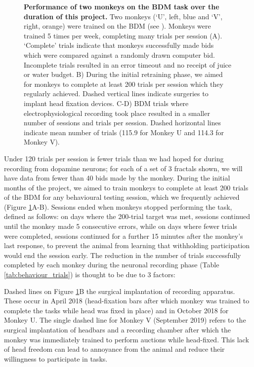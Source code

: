 \begin{figure}[htbp!] 
\centering    

\caption[Performance of two monkeys on the BDM task over the duration of this project.]{\textbf{Performance of two monkeys on the BDM task over the duration of this project.} Two monkeys (‘U’, left, blue and ‘V’, right, orange) were trained on the BDM (see \cite{almohammadRewardValueRevealed2022}). Monkeys were trained 5 times per week, completing many trials per session (A). ‘Complete’ trials indicate that monkeys successfully made bids which were compared against a randomly drawn computer bid. Incomplete trials resulted in an error timeout and no receipt of juice or water budget. B) During the initial retraining phase, we aimed for monkeys to complete at least 200 trials per session which they regularly achieved. Dashed vertical lines indicate surgeries to implant head fixation devices. C-D) BDM trials where electrophysiological recording took place resulted in a smaller number of sessions and trials per session. Dashed horizontal lines indicate mean number of trials (115.9 for Monkey U and 114.3 for Monkey V).}
\label{fig:monkey_trials}
\end{figure}

Under 120 trials per session is fewer trials than we had hoped for during recording from dopamine neurons; for each of a set of 3 fractals shown, we will have data from fewer than 40 bids made by the monkey. During the initial months of the project, we aimed to train monkeys to complete at least 200 trials of the BDM for any behavioural testing session, which we frequently achieved (Figure \ref{fig:monkey_trials}A-B). Sessions ended when monkeys stopped performing the task, defined as follows: on days where the 200-trial target was met, sessions continued until the monkey made 5 consecutive errors, while on days where fewer trials were completed, sessions continued for a further 15 minutes after the monkey's last response, to prevent the animal from learning that withholding participation would end the session early. The reduction in the number of trials successfully completed by each monkey during the neuronal recording phase  (Table \ref{tab:behaviour_trials}) is thought to be due to 3 factors: 

Dashed lines on Figure \ref{fig:monkey_trials}B the surgical implantation of recording apparatus. These occur in April 2018 (head-fixation bars after which monkey was trained to complete the tasks while head was fixed in place) and in October 2018 for Monkey U. The single dashed line for Monkey V (September 2019) refers to the surgical implantation of headbars and a recording chamber after which the monkey was immediately trained to perform auctions while head-fixed. This lack of head freedom can lead to annoyance from the animal and reduce their willingness to participate in tasks.

